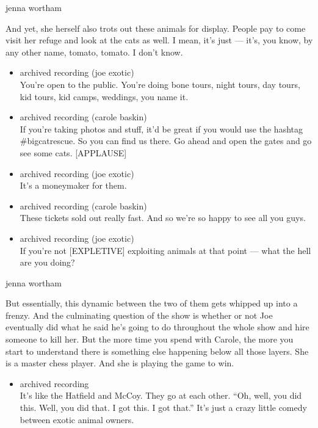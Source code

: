 jenna wortham

And yet, she herself also trots out these animals for display. People
pay to come visit her refuge and look at the cats as well. I mean, it's
just --- it's, you know, by any other name, tomato, tomato. I don't
know.

\begin{itemize}
\item
  archived recording (joe exotic)\\
  You're open to the public. You're doing bone tours, night tours, day
  tours, kid tours, kid camps, weddings, you name it.
\item
  archived recording (carole baskin)\\
  If you're taking photos and stuff, it'd be great if you would use the
  hashtag \#bigcatrescue. So you can find us there. Go ahead and open
  the gates and go see some cats. {[}APPLAUSE{]}
\item
  archived recording (joe exotic)\\
  It's a moneymaker for them.
\item
  archived recording (carole baskin)\\
  These tickets sold out really fast. And so we're so happy to see all
  you guys.
\item
  archived recording (joe exotic)\\
  If you're not {[}EXPLETIVE{]} exploiting animals at that point ---
  what the hell are you doing?
\end{itemize}

jenna wortham

But essentially, this dynamic between the two of them gets whipped up
into a frenzy. And the culminating question of the show is whether or
not Joe eventually did what he said he's going to do throughout the
whole show and hire someone to kill her. But the more time you spend
with Carole, the more you start to understand there is something else
happening below all those layers. She is a master chess player. And she
is playing the game to win.

\begin{itemize}
\tightlist
\item
  archived recording\\
  It's like the Hatfield and McCoy. They go at each other. ``Oh, well,
  you did this. Well, you did that. I got this. I got that.'' It's just
  a crazy little comedy between exotic animal owners.
\end{itemize}

